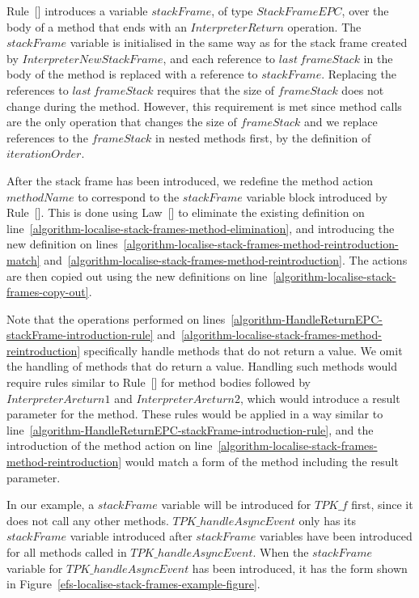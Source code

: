 Rule~[]
introduces a variable $stackFrame$, of type $StackFrameEPC$, over the
body of a method that ends with an $InterpreterReturn$ operation.
The $stackFrame$ variable is initialised in the same way as for the
stack frame created by $InterpreterNewStackFrame$, and each reference
to $last~frameStack$ in the body of the method is replaced with a
reference to $stackFrame$.
Replacing the references to $last~frameStack$ requires that the size
of $frameStack$ does not change during the method.
However, this requirement is met since method calls are the only
operation that changes the size of $frameStack$ and we replace
references to the $frameStack$ in nested methods first, by the
definition of $iterationOrder$.

After the stack frame has been introduced, we redefine the method
action $methodName$ to correspond to the $stackFrame$ variable block
introduced by
Rule~[].
This is done using Law~[] to eliminate the
existing definition on
line~\ref{algorithm-localise-stack-frames-method-elimination}, and
introducing the new definition on
lines~\ref{algorithm-localise-stack-frames-method-reintroduction-match}
and~\ref{algorithm-localise-stack-frames-method-reintroduction}.
The actions are then copied out using the new definitions on
line~\ref{algorithm-localise-stack-frames-copy-out}.

Note that the operations performed on
lines~\ref{algorithm-HandleReturnEPC-stackFrame-introduction-rule}
and~\ref{algorithm-localise-stack-frames-method-reintroduction}
specifically handle methods that do not return a value.
We omit the handling of methods that do return a value. 
Handling such methods would require rules similar to
Rule~[] for
method bodies followed by $InterpreterAreturn1$ and
$InterpreterAreturn2$, which would introduce a result parameter for
the method.
These rules would be applied in a way similar to
line~\ref{algorithm-HandleReturnEPC-stackFrame-introduction-rule}, and
the introduction of the method action on
line~\ref{algorithm-localise-stack-frames-method-reintroduction} would
match a form of the method including the result parameter.

In our example, a $stackFrame$ variable will be introduced for
$TPK\_f$ first, since it does not call any other methods.
$TPK\_handleAsyncEvent$ only has its $stackFrame$ variable introduced
after $stackFrame$ variables have been introduced for all methods
called in $TPK\_handleAsyncEvent$.
When the $stackFrame$ variable for $TPK\_handleAsyncEvent$ has been
introduced, it has the form shown in
Figure~\ref{efs-localise-stack-frames-example-figure}.

